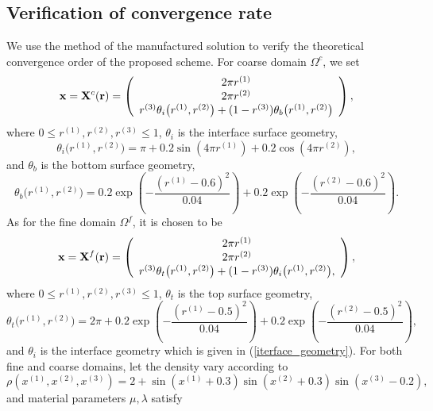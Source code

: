 \subsection{Verification of convergence rate}\label{convergence_study}
We use the method of the manufactured solution to verify the theoretical convergence order of the proposed scheme. For coarse domain $\Omega^c$, we set
\[ {\bf x} = {\bf X}^c({\bf r}) = \left(\begin{array}{c}
2\pi r^{(1)} \\
2\pi r^{(2)} \\
r^{(3)}\theta_i\big(r^{(1)},r^{(2)}\big) + (1-r^{(3)})\theta_b\big(r^{(1)},r^{(2)}\big) \end{array}\right), \]
where $0\leq r^{(1)}, r^{(2)}, r^{(3)}\leq 1$, $\theta_i$ is the interface surface geometry,
\begin{equation}\label{iterface_geometry}
\theta_i\big(r^{(1)},r^{(2)}\big) = \pi+0.2\sin(4\pi r^{(1)})+0.2\cos(4\pi r^{(2)}),
\end{equation}
and $\theta_b$ is the bottom surface geometry,
\begin{equation*}\label{bottom_geometry}
\theta_b\big(r^{(1)},r^{(2)}\big) = 0.2\exp\left(-\frac{(r^{(1)}-0.6)^2}{0.04}\right)+0.2\exp\left(-\frac{(r^{(2)}-0.6)^2}{0.04}\right).
\end{equation*}
As for the fine domain $\Omega^f$, it is chosen to be
\[ {\bf x} = {\bf X}^f({\bf r}) = \left(\begin{array}{c}
2\pi r^{(1)}\\
2\pi r^{(2)}\\
r^{(3)}\theta_t\big(r^{(1)},r^{(2)}\big) + (1-r^{(3)})\theta_i\big(r^{(1)},r^{(2)}\big), \end{array}\right), \]
where $0\leq r^{(1)}, r^{(2)}, r^{(3)}\leq 1$, $\theta_t$ is the top surface geometry,
\begin{equation*}\label{top_geometry}
\theta_t\big(r^{(1)},r^{(2)}\big) = 2\pi+0.2\exp\left(-\frac{(r^{(1)}-0.5)^2}{0.04}\right)+0.2\exp\left(-\frac{(r^{(2)}-0.5)^2}{0.04}\right),
\end{equation*}
and $\theta_i$ is the interface geometry which is given in (\ref{iterface_geometry}). For both fine and coarse domains, let the density vary according to
\begin{equation*}\label{density_function}
\rho(x^{(1)},x^{(2)},x^{(3)}) = 2 + \sin(x^{(1)}+0.3)\sin(x^{(2)}+0.3)\sin(x^{(3)}-0.2),
\end{equation*}
and material parameters $\mu, \lambda$ satisfy
